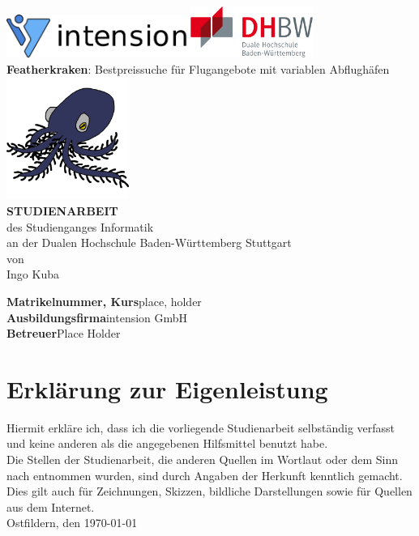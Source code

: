 \documentclass[12pt,twoside,a4paper]{article}
\begin{document}
\begin{center}
\href{https://www.intension.de/}{\includegraphics[width=6cm]{images/intension}}\hfill\href{https://www.dhbw-stuttgart.de}{\includegraphics[width=4cm]{images/dhbw}}\\
\large
\vspace{3cm}
\textbf{Featherkraken}: Bestpreissuche für Flugangebote mit variablen Abflughäfen\\
\vspace{2cm}
\includegraphics[width=4cm]{images/featherkraken}\\
\textbf{\Large STUDIENARBEIT}
\vspace{1cm}
\\des Studienganges Informatik
\\an der Dualen Hochschule Baden-Württemberg Stuttgart
\\von
\\Ingo Kuba
\end{center}
\vspace{2cm}
\textbf{Matrikelnummer, Kurs}\hfill place, holder\\
\textbf{Ausbildungsfirma}\hfill intension GmbH\\
\textbf{Betreuer}\hfill Place Holder
\newpage
\section*{Erklärung zur Eigenleistung}
Hiermit erkläre ich, dass ich die vorliegende Studienarbeit selbständig verfasst und keine anderen als die angegebenen Hilfsmittel benutzt habe.\\
Die Stellen der Studienarbeit, die anderen Quellen im Wortlaut oder dem Sinn nach entnommen wurden, sind durch Angaben der Herkunft kenntlich gemacht. Dies gilt auch für Zeichnungen, Skizzen, bildliche Darstellungen sowie für Quellen aus dem Internet.
\vspace{1cm}\\Ostfildern, den \today \hspace{1cm} \hrulefill
\newpage
\end{document}
